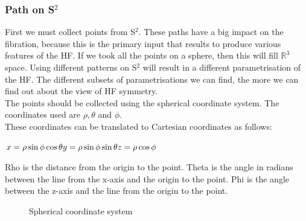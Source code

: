 \documentclass[12pt]{article} %
\begin{document}
\begin{flushleft}
\subsubsection{Path on S$^{2}$} %
First we must collect points from  S$^{2}$. These paths have a big impact on the fibration, because this is the primary input that results to produce various features of the HF. If we took all the points on a sphere, then this will fill $\mathbb{R}^{3}$ space. Using different patterns on  S$^{2}$ will result in a different parametrisation of the HF. The different subsets of parametrisations we can find, the more we can find out about the view of HF symmetry.\\ 
The points should be collected using the spherical coordinate system. The coordinates used are $\rho, \theta$ and $\phi$.\\
These coordinates can be translated to Cartesian coordinates as follows:\\
\begin{center}
$
x = \rho \sin \phi \cos \theta \break
y = \rho \sin \phi \sin \theta \break
z = \rho \cos \phi 
$
\end{center}
Rho is the distance from the origin to the point. Theta is the angle in radians between the line from the x-axis and the origin to the point. Phi is the angle between the z-axis and the line from the origin to the point.\\

\begin{figure}[H] %
\caption{Spherical coordinate system\cite{Weisstein:sc}}
\label{fig:speciation}
\end{figure}


\end{flushleft}
\end{document}
